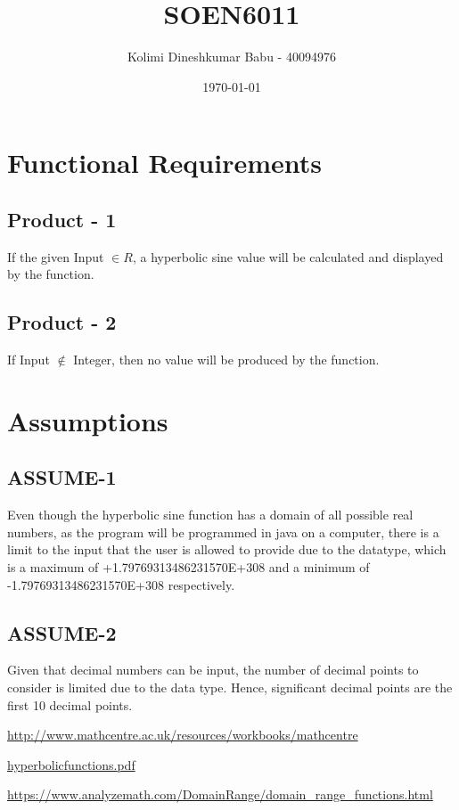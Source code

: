 \documentclass[a4paper,10pt]{article}
\title{SOEN6011}
\author{Kolimi Dineshkumar Babu - 40094976}
\date{\today}
\begin{document}
\maketitle
\section*{}
\section {Functional Requirements} 

	\subsection {Product - 1}

		\newline If the given Input $\in R$, a hyperbolic sine value will be calculated and displayed by the function.


	\subsection {Product - 2}
		\newline If Input $\not\in$ Integer, then no value will be produced by the function.

\section{Assumptions}
	\subsection {ASSUME-1}
	Even though the hyperbolic sine function has a domain of all possible real numbers, as the program will be programmed in java on a computer, there is a limit to the input that the user is allowed to provide due to the datatype, which is a maximum of +1.79769313486231570E+308 and a minimum of -1.79769313486231570E+308 respectively.

	\subsection {ASSUME-2} 
Given that decimal numbers can be input, the number of decimal points to consider is limited due to the data type. Hence, significant decimal points are the first 10 decimal points.

 \begin{thebibliography}{9}
        \bibitem{}
        \url{http://www.mathcentre.ac.uk/resources/workbooks/mathcentre}

        \bibitem{}
        \url{hyperbolicfunctions.pdf}

        \bibitem{}
        \url{https://www.analyzemath.com/DomainRange/domain_range_functions.html}

\end{thebibliography}
\end{document}
